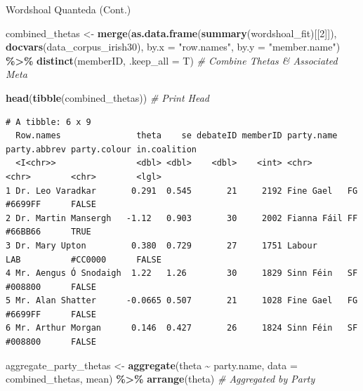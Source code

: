 \documentclass[
  ignorenonframetext,
  aspectratio=169]{beamer}
\newenvironment{Shaded}{\begin{snugshade}}{\end{snugshade}}
\newcommand{\AttributeTok}[1]{\textcolor[rgb]{0.13,0.29,0.53}{#1}}
\newcommand{\CommentTok}[1]{\textcolor[rgb]{0.56,0.35,0.01}{\textit{#1}}}
\newcommand{\DecValTok}[1]{\textcolor[rgb]{0.00,0.00,0.81}{#1}}
\newcommand{\FunctionTok}[1]{\textcolor[rgb]{0.13,0.29,0.53}{\textbf{#1}}}
\newcommand{\NormalTok}[1]{#1}
\newcommand{\OtherTok}[1]{\textcolor[rgb]{0.56,0.35,0.01}{#1}}
\newcommand{\SpecialCharTok}[1]{\textcolor[rgb]{0.81,0.36,0.00}{\textbf{#1}}}
\newcommand{\StringTok}[1]{\textcolor[rgb]{0.31,0.60,0.02}{#1}}
\begin{document}
\begin{frame}[fragile]{Wordshoal Quanteda (Cont.)}
\label{wordshoal-quanteda-cont.}
\scriptsize

\begin{Shaded}
\begin{Highlighting}[]
\NormalTok{combined\_thetas }\OtherTok{\textless{}{-}} \FunctionTok{merge}\NormalTok{(}\FunctionTok{as.data.frame}\NormalTok{(}\FunctionTok{summary}\NormalTok{(wordshoal\_fit)[[}\DecValTok{2}\NormalTok{]]),}
               \FunctionTok{docvars}\NormalTok{(data\_corpus\_irish30), }
               \AttributeTok{by.x =} \StringTok{"row.names"}\NormalTok{, }\AttributeTok{by.y =} \StringTok{"member.name"}\NormalTok{) }\SpecialCharTok{\%\textgreater{}\%}
  \FunctionTok{distinct}\NormalTok{(memberID, }\AttributeTok{.keep\_all =}\NormalTok{ T) }\CommentTok{\# Combine Thetas \& Associated Meta}

\FunctionTok{head}\NormalTok{(}\FunctionTok{tibble}\NormalTok{(combined\_thetas)) }\CommentTok{\# Print Head}
\end{Highlighting}
\end{Shaded}

\begin{verbatim}
# A tibble: 6 x 9
  Row.names               theta    se debateID memberID party.name  party.abbrev party.colour in.coalition
  <I<chr>>                <dbl> <dbl>    <dbl>    <int> <chr>       <chr>        <chr>        <lgl>       
1 Dr. Leo Varadkar       0.291  0.545       21     2192 Fine Gael   FG           #6699FF      FALSE       
2 Dr. Martin Mansergh   -1.12   0.903       30     2002 Fianna Fáil FF           #66BB66      TRUE        
3 Dr. Mary Upton         0.380  0.729       27     1751 Labour      LAB          #CC0000      FALSE       
4 Mr. Aengus Ó Snodaigh  1.22   1.26        30     1829 Sinn Féin   SF           #008800      FALSE       
5 Mr. Alan Shatter      -0.0665 0.507       21     1028 Fine Gael   FG           #6699FF      FALSE       
6 Mr. Arthur Morgan      0.146  0.427       26     1824 Sinn Féin   SF           #008800      FALSE       
\end{verbatim}

\begin{Shaded}
\begin{Highlighting}[]
\NormalTok{aggregate\_party\_thetas }\OtherTok{\textless{}{-}} \FunctionTok{aggregate}\NormalTok{(theta }\SpecialCharTok{\textasciitilde{}}\NormalTok{ party.name, }\AttributeTok{data =}\NormalTok{ combined\_thetas, mean) }\SpecialCharTok{\%\textgreater{}\%}
  \FunctionTok{arrange}\NormalTok{(theta) }\CommentTok{\# Aggregated by Party}
\end{Highlighting}
\end{Shaded}
\end{frame}
\end{document}
